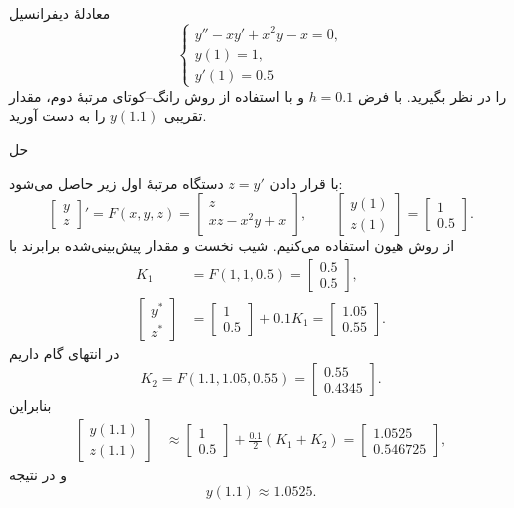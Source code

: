\\
معادلهٔ دیفرانسیل
\[
 \begin{cases}
 y''-xy'+x^2y-x=0,\\
 y(1)=1,\\
 y'(1)=0.5
 \end{cases}
\]
را در نظر بگیرید. با فرض
\(h=0.1\)
و با استفاده از روش رانگ--کوتای مرتبهٔ دوم، مقدار تقریبی
\(y(1.1)\)
را به دست آورید.

\begingroup\color{blue}
حل

با قرار دادن
\(z=y'\)
دستگاه مرتبهٔ اول زیر حاصل می‌شود:
\[
 \begin{bmatrix}y\\z\end{bmatrix}'=
 F(x,y,z)=
 \begin{bmatrix}z\\xz-x^2y+x\end{bmatrix},
 \qquad
 \begin{bmatrix}y(1)\\z(1)\end{bmatrix}=
 \begin{bmatrix}1\\0.5\end{bmatrix}.
\]
از روش هیون استفاده می‌کنیم. شیب نخست و مقدار پیش‌بینی‌شده برابرند با
\begin{align*}
 K_1&=F(1,1,0.5)=\begin{bmatrix}0.5\\0.5\end{bmatrix},\\
 \begin{bmatrix}y^*\\z^*\end{bmatrix}
 &=\begin{bmatrix}1\\0.5\end{bmatrix}+0.1K_1
 =\begin{bmatrix}1.05\\0.55\end{bmatrix}.
\end{align*}
در انتهای گام داریم
\[
 K_2=F(1.1,1.05,0.55)
 =\begin{bmatrix}0.55\\0.4345\end{bmatrix}.
\]
بنابراین
\begin{align*}
 \begin{bmatrix}y(1.1)\\z(1.1)\end{bmatrix}
 &\approx \begin{bmatrix}1\\0.5\end{bmatrix}
 +\frac{0.1}{2}(K_1+K_2)
 =\begin{bmatrix}1.0525\\0.546725\end{bmatrix},
\end{align*}
و در نتیجه
\[
 \boxed{y(1.1)\approx1.0525}.
\]
\endgroup
